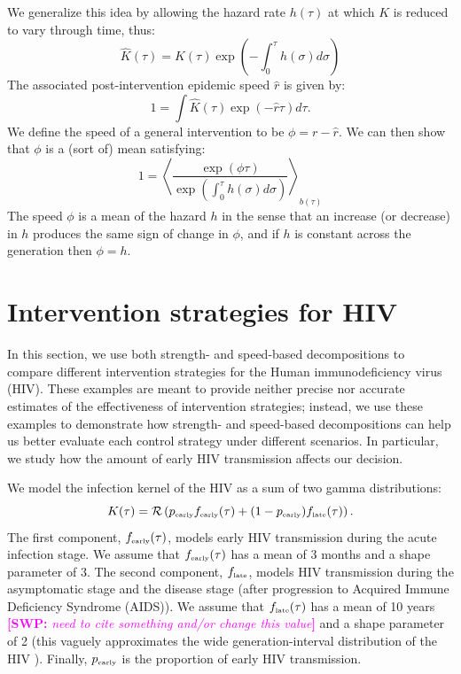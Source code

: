 \documentclass[12pt]{article}\usepackage[]{graphicx}\usepackage[]{color}
\newcommand{\comment}[3]{\textcolor{#1}{\textbf{[#2: }\textit{#3}\textbf{]}}}
\newcommand{\swp}[1]{\comment{magenta}{SWP}{#1}}
\newcommand{\tsub}[2]{#1_{{\textrm{\tiny #2}}}}
\begin{document}
We generalize this idea by allowing the hazard rate $h(\tau)$ at which $K$ is reduced to vary through time, thus:
\begin{equation}
	\hat K(\tau) = K(\tau) \exp\left(-\int_0^\tau h(\sigma) d\sigma\right)
\end{equation}
The associated post-intervention epidemic speed $\hat r$ is given by:
\begin{equation}
	1 = \int \hat K(\tau) \exp(-\hat r\tau) d\tau.	
\end{equation}
We define the speed of a general intervention to be $\phi = r - \hat r$. 
We can then show that $\phi$ is a (sort of) mean satisfying:
\begin{equation}
	1 = \left\langle \frac{\exp(\phi \tau) }{\exp\left(\int_0^\tau h(\sigma) d\sigma\right)} \right\rangle_{b(\tau)}
\end{equation}
The speed $\phi$ is a mean of the hazard $h$ in the sense that an increase (or decrease) in $h$ produces the same sign of change in $\phi$, and if $h$ is constant across the generation then $\phi=h$.

\section{Intervention strategies for HIV}

In this section, we use both strength- and speed-based decompositions to compare different intervention strategies for the Human immunodeficiency virus (HIV). 
These examples are meant to provide neither precise nor accurate estimates of the effectiveness of intervention strategies; 
instead, we use these examples to demonstrate how strength- and speed-based decompositions can help us better evaluate each control strategy under different scenarios.
In particular, we study how the amount of early HIV transmission affects our decision.

We model the infection kernel of the HIV as a sum of two gamma distributions:
\begin{equation}
K(\tau) = \mathcal R \left(\tsub{p}{early} \tsub{f}{early}(\tau) + (1-\tsub{p}{early}) \tsub{f}{late}(\tau) \right).
\end{equation}
The first component, $\tsub{f}{early}(\tau)$, models early HIV transmission during the acute infection stage.
We assume that $\tsub{f}{early}(\tau)$ has a mean of 3 months \citep{hollingsworth2008hiv} and a shape parameter of 3.
The second component, $\tsub{f}{late}$, models HIV transmission during the asymptomatic stage and the disease stage (after progression to Acquired Immune Deficiency Syndrome (AIDS)).
We assume that $\tsub{f}{late}(\tau)$ has a mean of 10 years \swp{need to cite something and/or change this value} and a shape parameter of 2 (this vaguely approximates the wide generation-interval distribution of the HIV \citep{fraser2004factors}).
Finally, $\tsub{p}{early}$ is the proportion of early HIV transmission.
\end{document}
